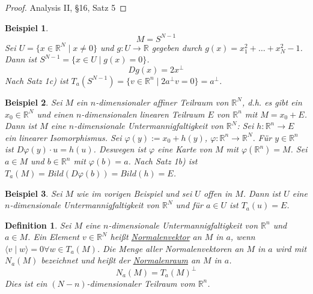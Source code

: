\documentclass[10pt,a4paper]{report}
\newtheorem*{defi}{Definition}
\newtheorem*{example}{Beispiel}
\begin{document}
\begin{proof}
  Analysis II, §16, Satz 5
\end{proof}

\begin{example}
  \begin{equation}
    M = S^{N - 1}
  \end{equation}
  Sei $U = \{ x \in \mathbb{R}^{N} \mid x \ne 0 \}$ und $g : U \rightarrow \mathbb{R}$ gegeben durch $g(x) = x_{1}^{2} + \dots + x_{N}^{2} - 1$.
  Dann ist $S^{N - 1} = \{ x \in U \mid g(x) = 0 \}$.
  \begin{equation}
    Dg(x) = 2x^{\perp}
  \end{equation}
  Nach Satz 1c) ist $T_{a}(S^{N - 1}) = \{ v \in \mathbb{R}^{n} \mid 2a^{\perp}v = 0 \} = a^{\perp}$.
\end{example}

\begin{example}
  Sei $M$ ein $n$-dimensionaler affiner Teilraum von $\mathbb{R}^{N}$, d.h. es gibt ein $x_{0} \in \mathbb{R}^{N}$ und einen $n$-dimensionalen linearen Teilraum $E$ von $\mathbb{R}^{n}$ mit $M = x_{0} + E$.
  Dann ist $M$ eine $n$-dimensionale Untermannigfaltigkeit von $\mathbb{R}^{N}$: Sei $h : \mathbb{R}^{n} \rightarrow E$ ein linearer Isomorphismus.
  Sei $\varphi(y) := x_{0} + h(y)$, $\varphi : \mathbb{R}^{n} \rightarrow \mathbb{R}^{N}$.
  Für $y \in \mathbb{R}^{n}$ ist $D\varphi(y) \cdot u = h(u)$.
  Deswegen ist $\varphi$ eine Karte von $M$ mit $\varphi(\mathbb{R}^{n}) = M$.
  Sei $a \in M$ und $b \in \mathbb{R}^{n}$ mit $\varphi(b) = a$.
  Nach Satz 1b) ist $T_{a}(M) = Bild(D\varphi(b)) = Bild(h) = E$.
\end{example}

\begin{example}
  Sei $M$ wie im vorigen Beispiel und sei $U$ offen in $M$.
  Dann ist $U$ eine $n$-dimensionale Untermannigfaltigkeit von $\mathbb{R}^{N}$ und für $a \in U$ ist $T_{a}(u) = E$.
\end{example}

\begin{defi}
  Sei $M$ eine $n$-dimensionale Untermannigfaltigkeit von $\mathbb{R}^{n}$ und $a \in M$.
  Ein Element $v \in \mathbb{R}^{N}$ heißt \underline{Normalenvektor} an $M$ in $a$, wenn $\langle v \mid w \rangle = 0 \forall w \in T_{a}(M)$.
  Die Menge aller Normalenvektoren an $M$ in $a$ wird mit $N_{a}(M)$ bezeichnet und heißt der \underline{Normalenraum} an $M$ in $a$.
  \begin{equation}
    N_{a}(M) = T_{a}(M)^{\perp}
  \end{equation}
  Dies ist ein $(N - n)$-dimensionaler Teilraum vom $\mathbb{R}^{n}$.
\end{defi}
\end{document}
